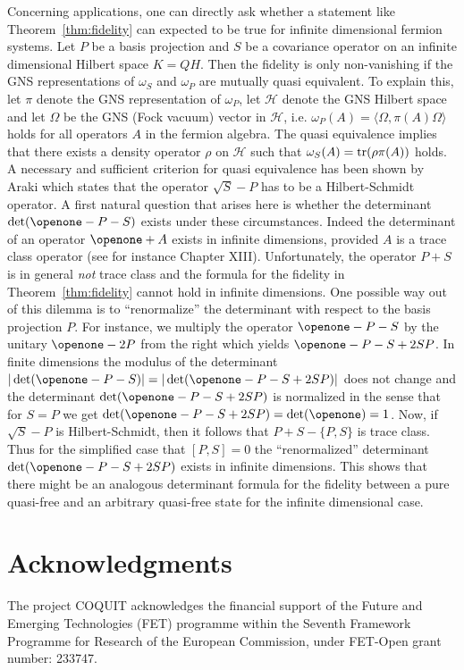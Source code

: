 \documentclass[pra,twoside,amsmath,amsfonts,amssymb,superscriptaddress,showpacs]{revtex4}
\def\2#1{{\mathcal #1}}
\def\8#1{{\rm #1}}
\def\I{\openone}
\newcommand{\SPROD}[2]{\langle{#1},{#2}\rangle}
\newcommand{\ACO}[2]{\{#1,#2\}}
\begin{document}
Concerning applications, one can directly ask whether a statement like Theorem~\ref{thm:fidelity}
can expected to be true for infinite dimensional fermion systems. Let $P$ be a basis projection
and $S$ be a covariance operator on an infinite dimensional Hilbert space $K=QH$. Then the fidelity
is only non-vanishing if the GNS representations of $\omega_S$ and $\omega_P$ are mutually quasi
equivalent. To explain this, let $\pi$ denote the GNS representation of $\omega_P$, let $\2H$ denote
the GNS Hilbert space and let $\Omega$ be the GNS
(Fock vacuum) vector in $\2H$, i.e. $\omega_P(A)=\SPROD{\Omega}{\pi(A)\Omega}$ holds for all
operators $A$ in the fermion algebra. The quasi equivalence implies that there exists a
density operator $\rho$ on $\2H$ such that $\omega_S(A)=\8{tr}(\rho\pi(A))$ holds.
A necessary and sufficient criterion for quasi equivalence has been shown by Araki
\cite[Theorem 1]{Araki87} which states that the operator $\sqrt{S}-P$ has to be a
Hilbert-Schmidt operator. A first natural question that arises here is whether the determinant
$\det(\I-P-S)$ exists under these circumstances. Indeed the determinant of an operator $\I+A$
exists in infinite dimensions, provided $A$ is a trace class operator (see for instance
\cite{RESI4} Chapter XIII). Unfortunately, the operator $P+S$ is in general {\em not} trace class
and the formula for the fidelity in Theorem~\ref{thm:fidelity} cannot hold in infinite
dimensions. One possible way out of this dilemma is to ``renormalize'' the determinant with respect
to the basis projection $P$. For instance, we multiply the operator $\I-P-S$ by the unitary $\I-2P$
from the right which yields $\I-P-S+2SP$. In finite dimensions the modulus of the determinant
$|\det(\I- P-S)|=|\det(\I-P-S+2SP)|$ does not change and the determinant $\det(\I-P-S+2SP)$ is
normalized in the sense that for $S=P$ we get 
$\det(\I-P-S+2SP)=\det(\I)=1$. Now, if $\sqrt{S}-P$ is Hilbert-Schmidt, then it follows that
$P+S-\ACO{P}{S}$ is trace class. Thus for the simplified case that $[P,S]=0$ the ``renormalized''
determinant $\det(\I-P-S+2SP)$ exists in infinite dimensions. This shows that there might be an
analogous determinant formula for the fidelity between a pure quasi-free and an arbitrary
quasi-free state for the infinite dimensional case.  

\section*{Acknowledgments}
The project COQUIT acknowledges the financial support of the Future and Emerging Technologies
(FET) programme within the Seventh Framework Programme for Research of the European Commission,
under FET-Open grant number: 233747.
\end{document}
